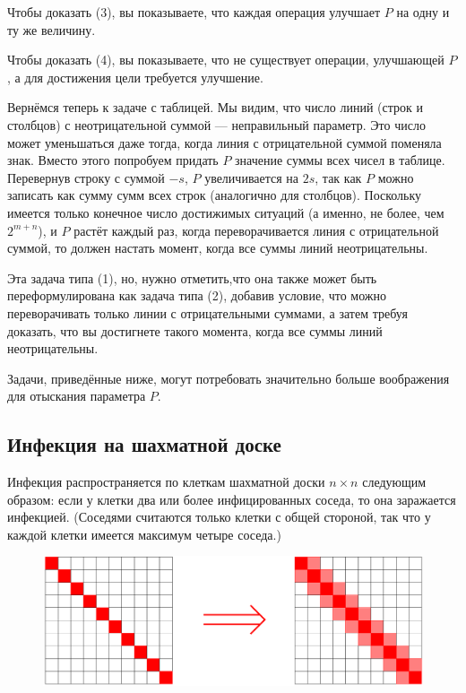 Чтобы доказать (3), вы показываете, что каждая операция улучшает $P$ на одну и ту же величину.

Чтобы доказать (4), вы показываете, что не существует операции, улучшающей $P$, а для достижения цели требуется улучшение.

\smallskip

Вернёмся теперь к задаче с таблицей.
Мы видим, что число линий (строк и столбцов) с неотрицательной суммой --- неправильный параметр.
Это число может уменьшаться даже тогда, когда линия с отрицательной суммой поменяла знак.
Вместо этого попробуем придать $P$ значение суммы всех чисел в таблице.
Перевернув строку с суммой $-s$, $P$ увеличивается на $2s$, так как $P$ можно записать как сумму сумм всех строк (аналогично для столбцов).
Поскольку имеется только конечное число достижимых ситуаций
(а именно, не более, чем $2^{m+n}$), и $P$ растёт каждый раз, когда переворачивается линия с отрицательной суммой, то должен настать момент, когда все суммы линий неотрицательны.

Эта задача типа (1), но, нужно отметить,что она также может быть переформулирована как задача типа (2), добавив условие, что можно переворачивать только линии с отрицательными суммами, а затем требуя доказать, что вы достигнете такого момента, когда все суммы линий неотрицательны.

\medskip

Задачи, приведённые ниже, могут потребовать значительно больше воображения для отыскания параметра $P$.

\subsection*{Инфекция на шахматной доске}%

Инфекция распространяется по клеткам шахматной доски $n \times n$ следующим образом: если у клетки два или более инфицированных соседа, то она заражается инфекцией.
(Соседями считаются только клетки с общей стороной, так что у каждой клетки имеется максимум четыре соседа.)

\begin{figure}
\centering
\includegraphics[scale=0.6]{Figs/Algorithms/diag}
\end{figure}

